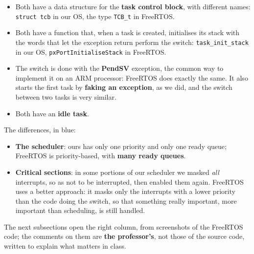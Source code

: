 \begin{itemize}
    \item Both have a data structure for the \textbf{task control block}, with different names: \texttt{struct tcb} in our OS, the type \texttt{TCB\_t} in FreeRTOS.
    \item Both have a function that, when a task is created, initialises its stack with the words that let the exception return perform the switch: \texttt{task\_init\_stack} in our OS, \texttt{pxPortInitialiseStack} in FreeRTOS.
    \item The switch is done with the \textbf{PendSV} exception, the common way to implement it on an ARM processor: FreeRTOS does exactly the same. It also starts the first task by \textbf{faking an exception}, as we did, and the switch between two tasks is very similar.
    \item Both have an \textbf{idle task}.
\end{itemize}
The differences, in blue:
\begin{itemize}
    \item \textbf{The scheduler}: ours has only one priority and only one ready queue; FreeRTOS is priority-based, with \textbf{many ready queues}.
    \item \textbf{Critical sections}: in some portions of our scheduler we masked \emph{all} interrupts, so as not to be interrupted, then enabled them again. FreeRTOS uses a better approach: it masks only the interrupts with a lower priority than the code doing the switch, so that something really important, more important than scheduling, is still handled.
\end{itemize}
The next subsections open the right column, from screenshots of the FreeRTOS code; the comments on them are \textbf{the professor's}, not those of the source code, written to explain what matters in class.

